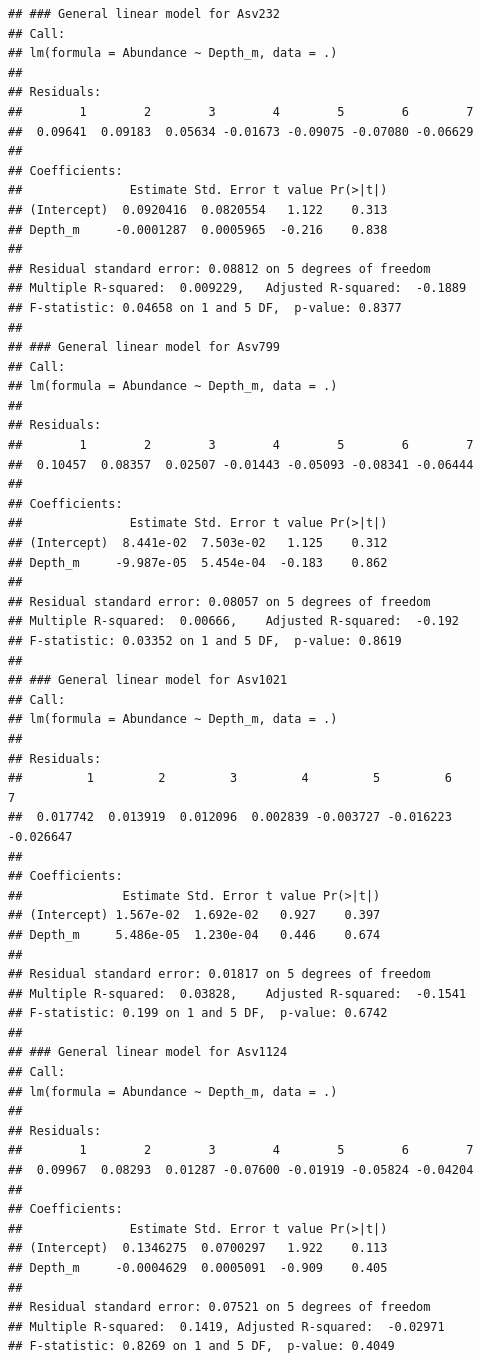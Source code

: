\documentclass[11 pt,]{article}
\begin{document}
\begin{verbatim}
## ### General linear model for Asv232
## Call:
## lm(formula = Abundance ~ Depth_m, data = .)
## 
## Residuals:
##        1        2        3        4        5        6        7 
##  0.09641  0.09183  0.05634 -0.01673 -0.09075 -0.07080 -0.06629 
## 
## Coefficients:
##               Estimate Std. Error t value Pr(>|t|)
## (Intercept)  0.0920416  0.0820554   1.122    0.313
## Depth_m     -0.0001287  0.0005965  -0.216    0.838
## 
## Residual standard error: 0.08812 on 5 degrees of freedom
## Multiple R-squared:  0.009229,   Adjusted R-squared:  -0.1889 
## F-statistic: 0.04658 on 1 and 5 DF,  p-value: 0.8377
## 
## ### General linear model for Asv799
## Call:
## lm(formula = Abundance ~ Depth_m, data = .)
## 
## Residuals:
##        1        2        3        4        5        6        7 
##  0.10457  0.08357  0.02507 -0.01443 -0.05093 -0.08341 -0.06444 
## 
## Coefficients:
##               Estimate Std. Error t value Pr(>|t|)
## (Intercept)  8.441e-02  7.503e-02   1.125    0.312
## Depth_m     -9.987e-05  5.454e-04  -0.183    0.862
## 
## Residual standard error: 0.08057 on 5 degrees of freedom
## Multiple R-squared:  0.00666,    Adjusted R-squared:  -0.192 
## F-statistic: 0.03352 on 1 and 5 DF,  p-value: 0.8619
## 
## ### General linear model for Asv1021
## Call:
## lm(formula = Abundance ~ Depth_m, data = .)
## 
## Residuals:
##         1         2         3         4         5         6         7 
##  0.017742  0.013919  0.012096  0.002839 -0.003727 -0.016223 -0.026647 
## 
## Coefficients:
##              Estimate Std. Error t value Pr(>|t|)
## (Intercept) 1.567e-02  1.692e-02   0.927    0.397
## Depth_m     5.486e-05  1.230e-04   0.446    0.674
## 
## Residual standard error: 0.01817 on 5 degrees of freedom
## Multiple R-squared:  0.03828,    Adjusted R-squared:  -0.1541 
## F-statistic: 0.199 on 1 and 5 DF,  p-value: 0.6742
## 
## ### General linear model for Asv1124
## Call:
## lm(formula = Abundance ~ Depth_m, data = .)
## 
## Residuals:
##        1        2        3        4        5        6        7 
##  0.09967  0.08293  0.01287 -0.07600 -0.01919 -0.05824 -0.04204 
## 
## Coefficients:
##               Estimate Std. Error t value Pr(>|t|)
## (Intercept)  0.1346275  0.0700297   1.922    0.113
## Depth_m     -0.0004629  0.0005091  -0.909    0.405
## 
## Residual standard error: 0.07521 on 5 degrees of freedom
## Multiple R-squared:  0.1419, Adjusted R-squared:  -0.02971 
## F-statistic: 0.8269 on 1 and 5 DF,  p-value: 0.4049
\end{verbatim}
\end{document}

